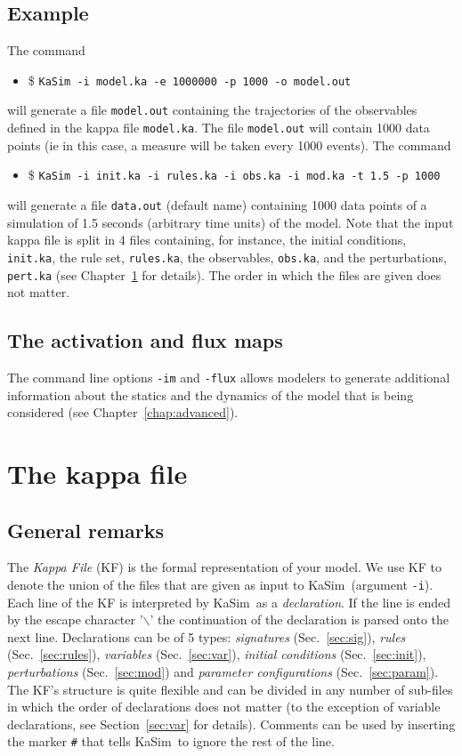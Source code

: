 \documentclass[11pt]{book}
\def\KaSim{\textsf{KaSim}}
\def\ttt#1{\texttt{#1}}
\def\bs{\backslash}
\def\ie{ie }
\def\ITE#1{\begin{itemize}#1\end{itemize}}
\begin{document}
\section*{Example}
The command 
\ITE{
\item[\$] \ttt{KaSim -i model.ka -e 1000000 -p 1000 -o model.out}  
}
will generate a file \ttt{model.out} containing the trajectories of the observables defined in the kappa file \ttt{model.ka}. The file \ttt{model.out} will contain 1000 data points (\ie in this case, a measure will be taken every 1000 events). The command
\ITE{
\item[\$] \ttt{KaSim -i init.ka -i rules.ka -i obs.ka -i mod.ka -t 1.5 -p 1000}  
}
will generate a file \ttt{data.out} (default name) containing 1000 data points of a simulation of 1.5 seconds (arbitrary time units) of the model. Note that the input kappa file is split in 4 files containing, for instance, the initial conditions, \ttt{init.ka}, the rule set, \ttt{rules.ka}, the observables, \ttt{obs.ka}, and the perturbations, \ttt{pert.ka} (see Chapter~\ref{chap:kappa} for details). The order in which the files are given does not matter.

\section*{The activation and flux maps}

The command line options \ttt{-im} and \ttt{-flux} allows modelers to generate additional information about the statics and the dynamics of the model that is being considered (see Chapter~\ref{chap:advanced}).

\chapter{The kappa file}\label{chap:kappa}

\section{General remarks}
The \emph{Kappa File} (KF) is the formal representation of your model. We use KF to denote the union of the files that are given as input to \KaSim~(argument \ttt{-i}). Each line of the KF is interpreted by \KaSim~as a \emph{declaration}. If the line is ended by the escape character '\ttt{$\bs$}' the continuation of the declaration is parsed onto the next line. Declarations can be of 5 types: \emph{signatures} (Sec.~\ref{sec:sig}), \emph{rules} (Sec.~\ref{sec:rules}), \emph{variables} (Sec.~\ref{sec:var}), \emph{initial conditions} (Sec.~\ref{sec:init}), \emph{perturbations} (Sec.~\ref{sec:mod}) and \emph{parameter configurations} (Sec.~\ref{sec:param}). The KF's structure is quite flexible and can be divided in any number of sub-files in which the order of declarations does not matter (to the exception of variable declarations, see Section~\ref{sec:var} for details). Comments can be used by inserting the marker \ttt{\#} that tells \KaSim~to ignore the rest of the line. 
\end{document}
